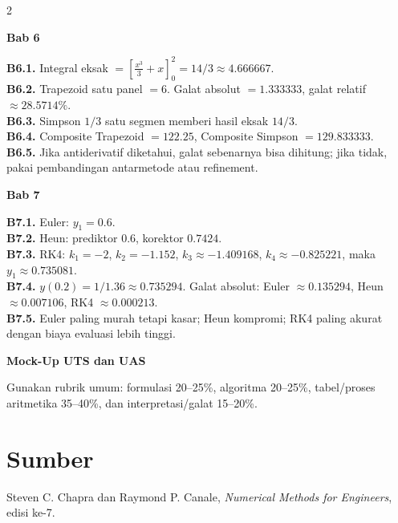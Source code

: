 \documentclass[10pt,a4paper]{article}
\begin{document}
\begin{multicols}{2}
\begin{chapterbox}{\color{white}\bfseries Bab 6}\end{chapterbox}
\textbf{B6.1.} Integral eksak \(=\left[\frac{x^3}{3}+x\right]_0^2=14/3\approx4.666667\).\\
\textbf{B6.2.} Trapezoid satu panel \(=6\). Galat absolut \(=1.333333\), galat relatif \(\approx28.5714\%\).\\
\textbf{B6.3.} Simpson \(1/3\) satu segmen memberi hasil eksak \(14/3\).\\
\textbf{B6.4.} Composite Trapezoid \(=122.25\), Composite Simpson \(=129.833333\).\\
\textbf{B6.5.} Jika antiderivatif diketahui, galat sebenarnya bisa dihitung; jika tidak, pakai pembandingan antarmetode atau refinement.

\begin{chapterbox}{\color{white}\bfseries Bab 7}\end{chapterbox}
\textbf{B7.1.} Euler: \(y_1=0.6\).\\
\textbf{B7.2.} Heun: prediktor \(0.6\), korektor \(0.7424\).\\
\textbf{B7.3.} RK4: \(k_1=-2\), \(k_2=-1.152\), \(k_3\approx-1.409168\), \(k_4\approx-0.825221\), maka \(y_1\approx0.735081\).\\
\textbf{B7.4.} \(y(0.2)=1/1.36\approx0.735294\). Galat absolut: Euler \(\approx0.135294\), Heun \(\approx0.007106\), RK4 \(\approx0.000213\).\\
\textbf{B7.5.} Euler paling murah tetapi kasar; Heun kompromi; RK4 paling akurat dengan biaya evaluasi lebih tinggi.

\begin{chapterbox}{\color{white}\bfseries Mock-Up UTS dan UAS}\end{chapterbox}
Gunakan rubrik umum: formulasi 20--25\%, algoritma 20--25\%, tabel/proses aritmetika 35--40\%, dan interpretasi/galat 15--20\%.

\end{multicols}

\section*{Sumber}
{\scriptsize Steven C. Chapra dan Raymond P. Canale, \textit{Numerical Methods for Engineers}, edisi ke-7.}
\end{document}
